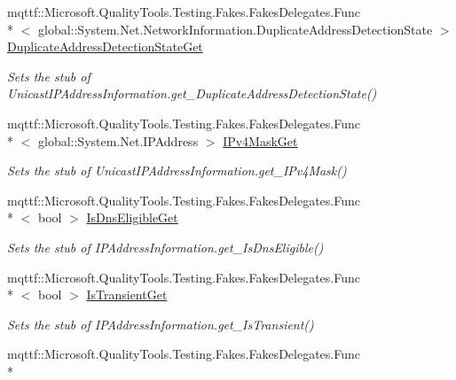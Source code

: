 \begin{DoxyCompactItemize}
mqttf\-::\-Microsoft.\-Quality\-Tools.\-Testing.\-Fakes.\-Fakes\-Delegates.\-Func\\*
$<$ global\-::\-System.\-Net.\-Network\-Information.\-Duplicate\-Address\-Detection\-State $>$ \hyperlink{class_system_1_1_net_1_1_network_information_1_1_fakes_1_1_stub_unicast_i_p_address_information_aca3c3da66c5f5ca41952e534d7b0fab4}{Duplicate\-Address\-Detection\-State\-Get}
\begin{DoxyCompactList}\small\item\em Sets the stub of Unicast\-I\-P\-Address\-Information.\-get\-\_\-\-Duplicate\-Address\-Detection\-State()\end{DoxyCompactList}\item 
mqttf\-::\-Microsoft.\-Quality\-Tools.\-Testing.\-Fakes.\-Fakes\-Delegates.\-Func\\*
$<$ global\-::\-System.\-Net.\-I\-P\-Address $>$ \hyperlink{class_system_1_1_net_1_1_network_information_1_1_fakes_1_1_stub_unicast_i_p_address_information_a296dd84ebaf1d00b0cddb7820f0ef66e}{I\-Pv4\-Mask\-Get}
\begin{DoxyCompactList}\small\item\em Sets the stub of Unicast\-I\-P\-Address\-Information.\-get\-\_\-\-I\-Pv4\-Mask()\end{DoxyCompactList}\item 
mqttf\-::\-Microsoft.\-Quality\-Tools.\-Testing.\-Fakes.\-Fakes\-Delegates.\-Func\\*
$<$ bool $>$ \hyperlink{class_system_1_1_net_1_1_network_information_1_1_fakes_1_1_stub_unicast_i_p_address_information_a142339e7e2540702a0c3613524f383bd}{Is\-Dns\-Eligible\-Get}
\begin{DoxyCompactList}\small\item\em Sets the stub of I\-P\-Address\-Information.\-get\-\_\-\-Is\-Dns\-Eligible()\end{DoxyCompactList}\item 
mqttf\-::\-Microsoft.\-Quality\-Tools.\-Testing.\-Fakes.\-Fakes\-Delegates.\-Func\\*
$<$ bool $>$ \hyperlink{class_system_1_1_net_1_1_network_information_1_1_fakes_1_1_stub_unicast_i_p_address_information_a21342ab9caf74e5e7c94f47f26970698}{Is\-Transient\-Get}
\begin{DoxyCompactList}\small\item\em Sets the stub of I\-P\-Address\-Information.\-get\-\_\-\-Is\-Transient()\end{DoxyCompactList}\item 
mqttf\-::\-Microsoft.\-Quality\-Tools.\-Testing.\-Fakes.\-Fakes\-Delegates.\-Func\\*

\end{DoxyCompactItemize}
